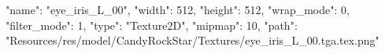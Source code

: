 {
  "name": "eye_iris_L_00",
  "width": 512,
  "height": 512,
  "wrap_mode": 0,
  "filter_mode": 1,
  "type": "Texture2D",
  "mipmap": 10,
  "path": "Resources/res/model/CandyRockStar/Textures/eye_iris_L_00.tga.tex.png"
}